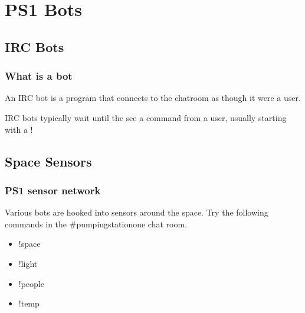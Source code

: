 \documentclass[hyperref={pdfpagelabels=false}]{beamer}
\begin{document}
\section{PS1 Bots}
	\subsection{IRC Bots}
		\frame
		{
			\frametitle{What is a bot}
			An IRC bot is a program that connects to the
			chatroom as though it were a user.

			IRC bots typically wait until the see a command
			from a user, usually starting with a !
		}
	\subsection{Space Sensors}
		\frame
		{
			\frametitle{PS1 sensor network}
			Various bots are hooked into sensors around the space.  Try the following commands in the \#pumpingstationone chat room.
			\begin{itemize}
				\item{!space}
				\item{!light}
				\item{!people}
				\item{!temp}
			\end{itemize}
		}
\end{document}
